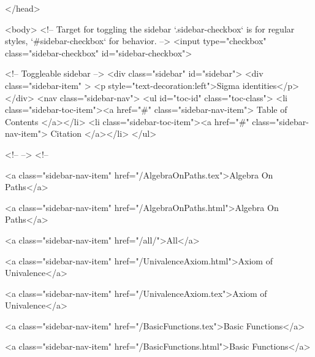   
</head>




  <body>
    <!-- Target for toggling the sidebar `.sidebar-checkbox` is for regular
     styles, `#sidebar-checkbox` for behavior. -->
<input type="checkbox" class="sidebar-checkbox" id="sidebar-checkbox">

<!-- Toggleable sidebar -->
<div class="sidebar" id="sidebar">
  <div class="sidebar-item" >
    <p style="text-decoration:left">Sigma identities</p>
  </div>
  <nav class="sidebar-nav">
    <ul id="toc-id" class="toc-class">
  <li class="sidebar-toc-item"><a href="#" class="sidebar-nav-item"> Table of Contents </a></li>
  <li class="sidebar-toc-item"><a href="#" class="sidebar-nav-item"> Citation </a></li>
</ul>


    <!--  -->
    <!-- 
      
    
      
    
      
    
      
        
      
    
      
        
          <a class="sidebar-nav-item" href="/AlgebraOnPaths.tex">Algebra On Paths</a>
        
      
    
      
        
          <a class="sidebar-nav-item" href="/AlgebraOnPaths.html">Algebra On Paths</a>
        
      
    
      
        
          <a class="sidebar-nav-item" href="/all/">All</a>
        
      
    
      
        
          <a class="sidebar-nav-item" href="/UnivalenceAxiom.html">Axiom of Univalence</a>
        
      
    
      
        
          <a class="sidebar-nav-item" href="/UnivalenceAxiom.tex">Axiom of Univalence</a>
        
      
    
      
        
          <a class="sidebar-nav-item" href="/BasicFunctions.tex">Basic Functions</a>
        
      
    
      
        
          <a class="sidebar-nav-item" href="/BasicFunctions.html">Basic Functions</a>
        

